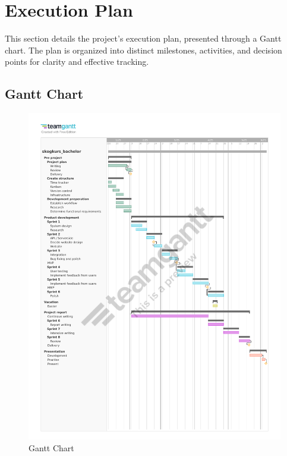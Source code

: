 \newpage
\section{Execution Plan}

This section details the project's execution plan, presented through a Gantt chart. The plan is organized into distinct milestones, activities, and decision points for clarity and effective tracking.

\subsection{Gantt Chart}

\begin{figure}[H]
    \centering
    \includegraphics[width=1.0\linewidth, trim=0 60mm 0 20mm, clip]{Images/skogkurs_bachelor_gantt.pdf}
    \caption{Gantt Chart}
    \label{fig:gantt}
\end{figure}

